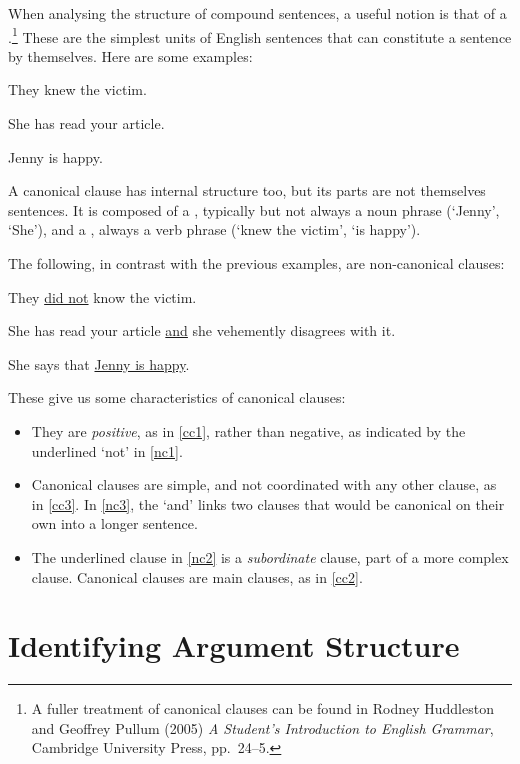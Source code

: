When analysing the structure of compound sentences, a useful notion is that of a .\footnote{A fuller treatment of canonical clauses can be found in Rodney Huddleston and Geoffrey Pullum (2005) \emph{A Student's Introduction to English Grammar}, Cambridge University Press, pp.\ 24–5.} These are the simplest units of English sentences that can constitute a sentence by themselves. Here are some examples: 
\begin{earg}
	\item[\ex{cc1}] They knew the victim.
	\item[\ex{cc3}] She has read your article.
	\item[\ex{cc2}] Jenny is happy.
\end{earg}
A canonical clause has internal structure too, but its parts are not themselves sentences. It is composed of a , typically but not always a noun phrase (`Jenny', `She'), and a , always a verb phrase (`knew the victim', `is happy'). 

The following, in contrast with the previous examples, are non-canonical clauses: 
\begin{earg}
	\item[\ex{nc1}] They \underline{did not} know the victim.
	\item[\ex{nc3}] She has read your article \underline{and} she vehemently disagrees with it.
	\item[\ex{nc2}] She says that \underline{Jenny is happy}.
\end{earg} These give us some characteristics of canonical clauses:
\begin{itemize}
	\item They are \emph{positive}, as in \ref{cc1}, rather than negative, as indicated by the underlined `not' in \ref{nc1}.
	\item Canonical clauses are simple, and not coordinated with any other clause, as in \ref{cc3}. In \ref{nc3}, the  `and' links two clauses that would be canonical on their own into a longer  sentence.
	\item The underlined clause in \ref{nc2} is a \emph{subordinate} clause, part of a more complex clause. Canonical clauses are main clauses, as in \ref{cc2}.
\end{itemize}

\section{Identifying Argument Structure}\label{ss.idargstr}

